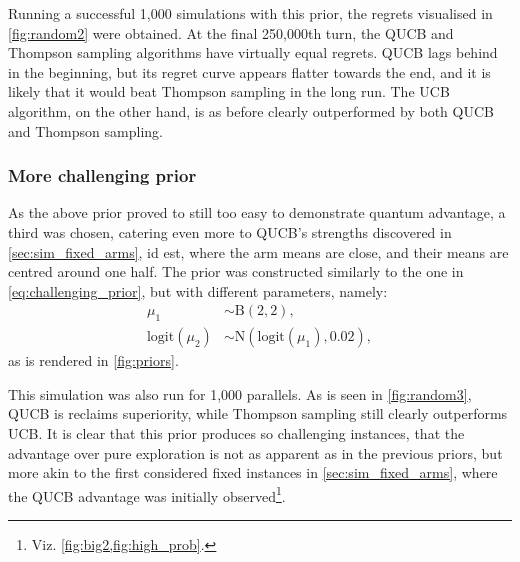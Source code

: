 Running a successful 1,000 simulations with this prior, the regrets visualised in \cref{fig:random2} were obtained.
At the final 250,000th turn, the QUCB and Thompson sampling algorithms have virtually equal regrets.
QUCB lags behind in the beginning, but its regret curve appears flatter towards the end, and it is likely that it would beat Thompson sampling in the long run.
The UCB algorithm, on the other hand, is as before clearly outperformed by both QUCB and Thompson sampling.

\subsubsection{More challenging prior}
As the above prior proved to still too easy to demonstrate quantum advantage, a third was chosen, catering even more to QUCB's strengths discovered in \cref{sec:sim_fixed_arms}, id est, where the arm means are close, and their means are centred around one half.
The prior was constructed similarly to the one in \cref{eq:challenging_prior}, but with different parameters, namely:
\begin{equation}
    \label{eq:more_challenging_prior}
    \begin{aligned}
        \mu_1               & \sim \text{B}(2, 2),                      \\
        \text{logit}(\mu_2) & \sim \text{N}(\text{logit}(\mu_1), 0.02),
    \end{aligned}
\end{equation}
as is rendered in \cref{fig:priors}.

This simulation was also run for 1,000 parallels.
As is seen in \cref{fig:random3}, QUCB is reclaims superiority, while Thompson sampling still clearly outperforms UCB.
It is clear that this prior produces so challenging instances, that the advantage over pure exploration is not as apparent as in the previous priors, but more akin to the first considered fixed instances in \cref{sec:sim_fixed_arms}, where the QUCB advantage was initially observed\footnote{Viz. \cref{fig:big2,fig:high_prob}.}.


